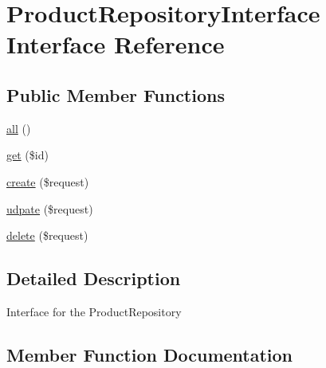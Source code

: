 \hypertarget{interface_app_1_1_repositories_1_1_product_1_1_product_repository_interface}{}\section{Product\+Repository\+Interface Interface Reference}
\label{interface_app_1_1_repositories_1_1_product_1_1_product_repository_interface}
\subsection*{Public Member Functions}
\begin{DoxyCompactItemize}
\item 
\mbox{\hyperlink{interface_app_1_1_repositories_1_1_product_1_1_product_repository_interface_af9d14e4ae6227970ad603987781573ca}{all}} ()
\item 
\mbox{\hyperlink{interface_app_1_1_repositories_1_1_product_1_1_product_repository_interface_a50e3bfb586b2f42932a6a93f3fbb0828}{get}} (\$id)
\item 
\mbox{\hyperlink{interface_app_1_1_repositories_1_1_product_1_1_product_repository_interface_a4fa811c83f27da01b0d92bdb2a711a13}{create}} (\$request)
\item 
\mbox{\hyperlink{interface_app_1_1_repositories_1_1_product_1_1_product_repository_interface_a2aedea52c52e54ba3c4c9f60423e7ef1}{udpate}} (\$request)
\item 
\mbox{\hyperlink{interface_app_1_1_repositories_1_1_product_1_1_product_repository_interface_a126a3799c44d72393ca4732081306dfd}{delete}} (\$request)
\end{DoxyCompactItemize}


\subsection{Detailed Description}
Interface for the Product\+Repository 

\subsection{Member Function Documentation}
\mbox{\label{interface_app_1_1_repositories_1_1_product_1_1_product_repository_interface_af9d14e4ae6227970ad603987781573ca}} 
